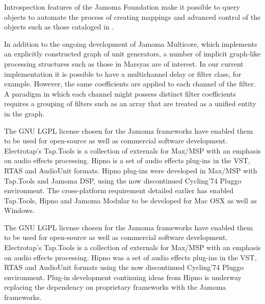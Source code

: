 \documentclass[twoside,10pt]{article}
\begin{document}
Introspection features of the Jamoma Foundation make it possible to query objects to automate the process of creating mappings and advanced control of the objects such as those cataloged in \cite{Pendharkar:2006}.


In addition to the ongoing development of Jamoma Multicore, which implements an explicitly constructed graph of unit generators, a number of implicit graph-like processing structures such as those in Marsyas are of interest.  \cite{Bray:2005}
In our current implementation it is possible to have a multichannel delay or filter class, for example.  However, the same coefficients are applied to each channel of the filter.  A paradigm in which each channel might possess distinct filter coefficients requires a grouping of filters such as an array that are treated as a unified entity in the graph.


The GNU LGPL license chosen for the Jamoma frameworks have enabled them to be used for open-source as well as commercial software development.  Electrotap's Tap.Tools\cite{web17} is a collection of externals for Max/MSP with an emphasis on audio effects processing.  Hipno\cite{Place:2005} is a set of audio effects plug-ins in the VST, RTAS and AudioUnit formats.  Hipno plug-ins were developed in Max/MSP with Tap.Tools and Jamoma DSP, using the now discontinued Cycling'74 Pluggo environment.  The cross-platform requirement detailed earlier has enabled Tap.Tools, Hipno and Jamoma Modular to be developed for Mac OSX as well as Windows. 



The GNU LGPL license chosen for the Jamoma frameworks have enabled them to be used for open-source as well as commercial software development.  Electrotap's Tap.Tools\cite{web17} is a collection of externals for Max/MSP with an emphasis on audio effects processing.  Hipno\cite{Place:2005} was a set of audio effects plug-ins in the VST, RTAS and AudioUnit formats using the now discontinued Cycling'74 Pluggo environment.  Plug-in development continuing ideas from Hipno is underway replacing the dependency on proprietary frameworks with the Jamoma frameworks.
\end{document}
